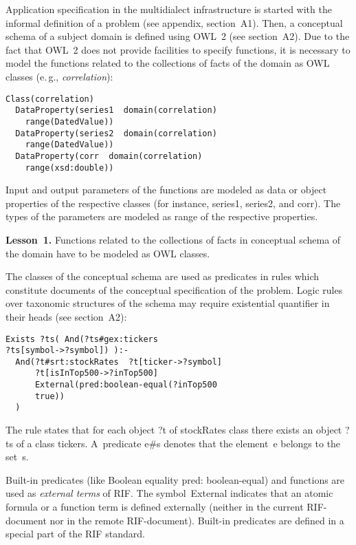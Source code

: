 \begin{multicols}{2}
  Application specification in the multidialect infrastructure is started with the
informal definition of a problem (see appendix, section~A1). Then, a conceptual schema of a
subject domain is defined using OWL~2 (see section~A2). Due to the
fact that OWL~2 does not provide facilities to specify functions,
it is necessary to model the
functions related to the collections of facts of the domain as OWL classes (e.\,g.,
\textit{correlation}):
  \begin{verbatim}
Class(correlation)
  DataProperty(series1  domain(correlation)
    range(DatedValue))
  DataProperty(series2  domain(correlation)
    range(DatedValue))
  DataProperty(corr  domain(correlation)
    range(xsd:double))
\end{verbatim}

  Input and output parameters of the functions are modeled as data or object
properties of the respective classes (for instance, {\sf series1},
{\sf  series2},   and {\sf corr}). The types of the parameters are modeled as {\sf  range}
of the respective properties.

  \medskip

  \noindent
  \textbf{Lesson~1.} Functions related to the collections of facts in conceptual
schema of the domain have to be modeled as OWL classes.

The classes of the conceptual schema are used as predicates in rules which constitute
documents of the conceptual specification of the problem. Logic rules over taxonomic
structures of the schema may require existential quantifier in their heads
(see section~A2):
\columnbreak

\noindent
  \begin{verbatim}
Exists ?ts( And(?ts#gex:tickers
?ts[symbol->?symbol]) ):-
  And(?t#srt:stockRates  ?t[ticker->?symbol]
      ?t[isInTop500->?inTop500]
      External(pred:boolean-equal(?inTop500
      true))
  )
\end{verbatim}

  The rule states that for each object {\sf ?t} of {\sf stockRates} class there exists an
object {\sf ?ts} of a class {\sf tickers}. A~predicate {\sf e\#s} denotes that the
element~{\sf e} belongs to the set~{\sf s}.

  Built-in predicates (like Boolean equality {\sf pred: boolean-equal}) and functions
are used as \textit{external terms} of RIF. The symbol~{\sf External} indicates that
an atomic formula or a function term is defined externally (neither in the current
  RIF-document nor in the remote RIF-document). Built-in predicates are defined in
a special part of the RIF standard.


\end{multicols}
